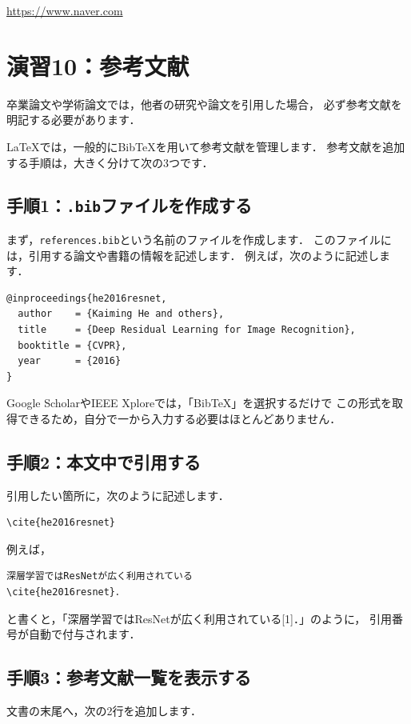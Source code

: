 \documentclass[a4paper,twocolumn,pdflatex,ja=standard]{bxjsarticle}
\begin{document}
\url{https://www.naver.com}

\section*{演習10：参考文献}
卒業論文や学術論文では，他者の研究や論文を引用した場合，
必ず参考文献を明記する必要があります．

LaTeXでは，一般的にBibTeXを用いて参考文献を管理します．
参考文献を追加する手順は，大きく分けて次の3つです．

\subsection*{手順1：\texttt{.bib}ファイルを作成する}
まず，\texttt{references.bib}という名前のファイルを作成します．
このファイルには，引用する論文や書籍の情報を記述します．
例えば，次のように記述します．

\begin{lstlisting}[language={}]
@inproceedings{he2016resnet,
  author    = {Kaiming He and others},
  title     = {Deep Residual Learning for Image Recognition},
  booktitle = {CVPR},
  year      = {2016}
}
\end{lstlisting}

Google ScholarやIEEE Xploreでは，「BibTeX」を選択するだけで
この形式を取得できるため，自分で一から入力する必要はほとんどありません．

\subsection*{手順2：本文中で引用する}
引用したい箇所に，次のように記述します．

\begin{verbatim}
\cite{he2016resnet}
\end{verbatim}

例えば，

\begin{verbatim}
深層学習ではResNetが広く利用されている
\cite{he2016resnet}．
\end{verbatim}

と書くと，「深層学習ではResNetが広く利用されている[1]．」のように，
引用番号が自動で付与されます．

\subsection*{手順3：参考文献一覧を表示する}
文書の末尾へ，次の2行を追加します．
\end{document}
